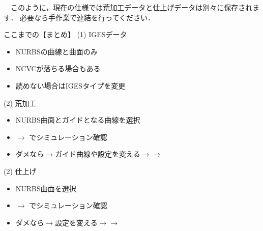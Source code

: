 　このように，現在の仕様では荒加工データと仕上げデータは別々に保存されます．
必要なら手作業で連結を行ってください．

\newpage
\begin{itembox}[l]{ここまでの【まとめ】}
(1) IGESデータ
\begin{itemize}
\item NURBSの曲線と曲面のみ
\item NCVCが落ちる場合もある
\item 読めない場合はIGESタイプを変更
\end{itemize}
(2) 荒加工
\begin{itemize}
\item NURBS曲面とガイドとなる曲線を選択
\item {}$\rightarrow$ でシミュレーション確認
\item ダメなら$\rightarrow$ガイド曲線や設定を変える$\rightarrow$$\rightarrow$
\end{itemize}
(2) 仕上げ
\begin{itemize}
\item NURBS曲面を選択
\item {}$\rightarrow$ でシミュレーション確認
\item ダメなら$\rightarrow$設定を変える$\rightarrow$$\rightarrow$
\end{itemize}
\end{itembox}
